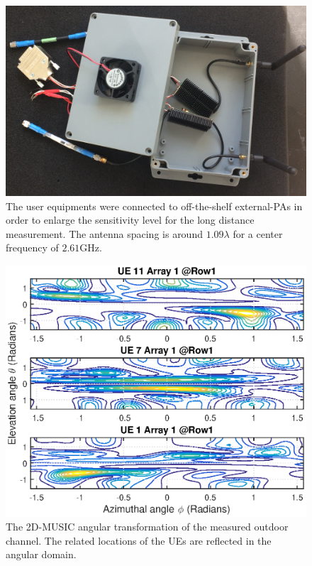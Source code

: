 \begin{figure}[t!]
	\centering
	\includegraphics[width=1\linewidth]{figures/user_equipment.PNG}
	\caption{The user equipments were connected to off-the-shelf external-PAs in order to enlarge the sensitivity level for the long distance measurement. The antenna spacing is around $1.09\lambda$ for a center frequency of $2.61$GHz.}
	\label{fig:UserEquipment}
\end{figure}

\begin{figure}[t!]
	\centering
	\includegraphics[width=1\linewidth]{figures/2DMUSICcollocated_row1_array1.eps}
	\caption{The 2D-MUSIC angular transformation of the measured outdoor channel. The related locations of the UEs are reflected in the angular domain.}
	\label{fig:2DMUSIC-measured-collocated-channel}
\end{figure}


